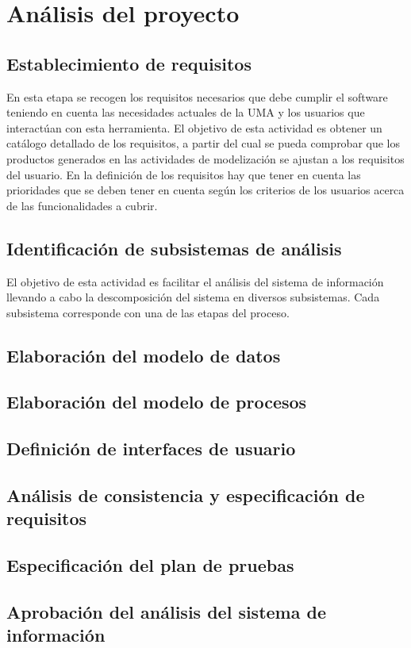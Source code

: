 \documentclass[11pt,a4paper,spanish,twoside]{report}
\begin{document}
\section{Análisis del proyecto}
\subsection{Establecimiento de requisitos}
En esta etapa se recogen los requisitos necesarios que debe cumplir el
software teniendo en cuenta las necesidades actuales de la UMA y los usuarios
que interactúan con esta herramienta. 
El objetivo de esta actividad es obtener un catálogo detallado de los
requisitos, a partir del cual se pueda comprobar que los productos generados
en las actividades de modelización se ajustan a los requisitos del usuario.
En la definición de los requisitos hay que tener en cuenta las prioridades
que se deben tener en cuenta según los criterios de los usuarios
acerca de las funcionalidades a cubrir. 
\subsection{Identificación de subsistemas de análisis}
El objetivo de esta actividad es facilitar el análisis del sistema de
información llevando a cabo la descomposición del sistema en diversos
subsistemas. 
Cada subsistema corresponde con una de las etapas del proceso.
\subsection{Elaboración del modelo de datos}

\subsection{Elaboración del modelo de procesos}
\subsection{Definición de interfaces de usuario}
\subsection{Análisis de consistencia y especificación de requisitos}
\subsection{Especificación del plan de pruebas}
\subsection{Aprobación del análisis del sistema de información}
\end{document}
